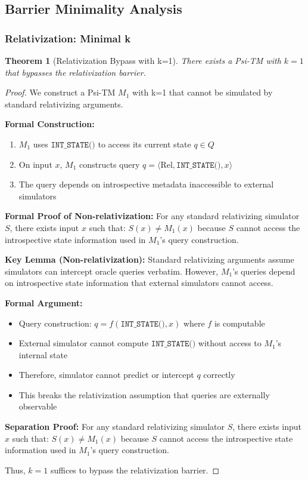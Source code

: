 \documentclass[11pt]{article}
\newtheorem{theorem}{Theorem}[section]
\theoremstyle{definition}
\begin{document}
\subsection{Barrier Minimality Analysis}

\subsubsection{Relativization: Minimal k}

\begin{theorem}[Relativization Bypass with k=1]
\label{thm:relativization-k1}
There exists a Psi-TM with $k=1$ that bypasses the relativization barrier.
\end{theorem}

\begin{proof}
We construct a Psi-TM $M_1$ with k=1 that cannot be simulated by standard relativizing arguments.

\textbf{Formal Construction:}
\begin{enumerate}
\item $M_1$ uses $\texttt{INT\_STATE()}$ to access its current state $q \in Q$
\item On input $x$, $M_1$ constructs query $q = \langle \text{Rel}, \texttt{INT\_STATE()}, x \rangle$
\item The query depends on introspective metadata inaccessible to external simulators
\end{enumerate}

\textbf{Formal Proof of Non-relativization:}
For any standard relativizing simulator $S$, there exists input $x$ such that:
$S(x) \neq M_1(x)$ because $S$ cannot access the introspective state information used in $M_1$'s query construction.

\textbf{Key Lemma (Non-relativization):} Standard relativizing arguments assume simulators can intercept oracle queries verbatim. However, $M_1$'s queries depend on introspective state information that external simulators cannot access.

\textbf{Formal Argument:}
\begin{itemize}
\item Query construction: $q = f(\texttt{INT\_STATE()}, x)$ where $f$ is computable
\item External simulator cannot compute $\texttt{INT\_STATE()}$ without access to $M_1$'s internal state
\item Therefore, simulator cannot predict or intercept $q$ correctly
\item This breaks the relativization assumption that queries are externally observable
\end{itemize}

\textbf{Separation Proof:}
For any standard relativizing simulator $S$, there exists input $x$ such that:
$S(x) \neq M_1(x)$ because $S$ cannot access the introspective state information used in $M_1$'s query construction.

Thus, $k=1$ suffices to bypass the relativization barrier.
\end{proof}
\end{document}
